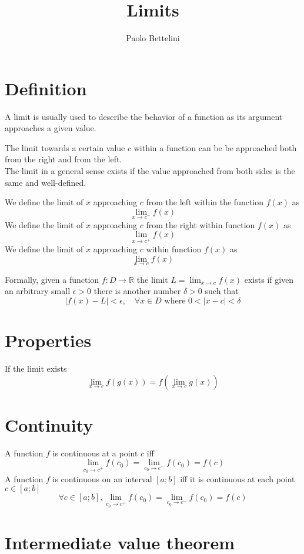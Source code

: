 \documentclass{article}
\title{Limits}
\author{Paolo Bettelini}
\date{}
\begin{document}
\maketitle
\tableofcontents
\pagebreak

\section{Definition}

A limit is usually used to describe the behavior of a function as its argument approaches a given value.

The limit towards a certain value \(c\) within a function can be be approached both from the right and from the left. \\
The limit in a general sense exists if the value approached from both sides is the same and well-defined.

We define the limit of \(x\) approaching \(c\) from the left within the function \(f(x)\) as
\[
    \lim_{x\to c^{-}}f(x)
\]
We define the limit of \(x\) approaching \(c\) from the right within function \(f(x)\) as
\[
    \lim_{x\to c^{+}}f(x)
\]
We define the limit of \(x\) approaching \(c\) within function \(f(x)\) as
\[
    \lim_{x\to c}f(x)
\]

Formally, given a function \(f:D\to \mathbb{R}\) the limit \(L=\lim_{x\to c}f(x)\) exists if given an arbitrary small \(\epsilon >0\) there is another number \(\delta >0\) such that
\[
    |f(x)-L|<\epsilon,\quad
    \forall x\in D \text{ where } 0<|x-c|<\delta
\]

\section{Properties}

If the limit exists
\[
    \lim_{x\to c}f(g(x))=f(\lim_{x\to c}g(x))
\]

\section{Continuity}

A function \(f\) is continuous at a point \(c\) iff
\[
    \lim_{c_0 \to c^+} f(c_0) = \lim_{c_0 \to c^-} f(c_0) = f(c)
\]
A function \(f\) is continuous on an interval \([a;b]\) iff it is continuous at each point \(c \in [a;b]\)
\[
    \forall c \in [a;b],
    \lim_{c_0 \to c^+} f(c_0) = \lim_{c_0 \to c^-} f(c_0) = f(c)
\]

\section{Intermediate value theorem}
\end{document}

